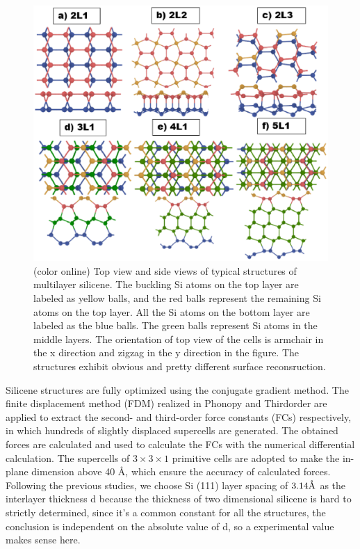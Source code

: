 \documentclass[review]{elsarticle}
\newcommand{\angstrom}{\mbox{\normalfont\AA}}
\begin{document}
\begin{figure}[b]
  \includegraphics[angle= 0, width=0.95\linewidth]{images/structures.eps}
  \caption{\label{fig:structures}  (color online)  Top view and side views of typical structures of multilayer silicene. The buckling Si atoms on the top layer are labeled as yellow balls, and the red balls represent the remaining Si atoms on the top layer. All the Si atoms on the bottom layer are labeled as the blue balls. The green balls represent Si atoms in the middle layers. The orientation of top view of the cells is armchair in the x direction and zigzag in the y direction in the figure. The structures exhibit obvious and pretty different surface reconsruction.}
\end{figure}

Silicene structures are fully optimized using the conjugate gradient method.  The finite displacement method (FDM) realized in Phonopy\cite{Togo2008} and Thirdorder \cite{Li2014} are applied to extract the second- and third-order force constants (FCs) respectively,  in which hundreds of  slightly displaced supercells are generated. The obtained forces are calculated and used to calculate the FCs with the numerical differential calculation. The supercells of $3 \times 3 \times 1$ primitive cells are adopted to make the in-plane dimension above 40 \angstrom, which ensure the accuracy of calculated forces. Following the previous studies\cite{Pei2013,Fu2014}, we choose Si (111) layer spacing of $3.14 \angstrom$ as the interlayer thickness d because the thickness of two dimensional silicene is hard to strictly  determined, since it's a common constant for all the structures, the conclusion is independent on the absolute value of d, so a experimental value makes sense here.
\end{document}

